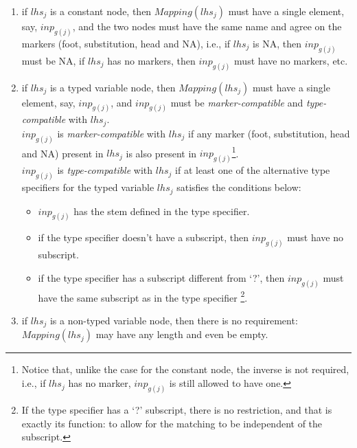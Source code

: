 \begin{enumerate}

\item if $lhs_j$ is a constant node, then $Mapping(lhs_j)$ must have a 
        single element, say, $inp_{g(j)}$, and the two nodes must have the same
        name and agree on the markers (foot, substitution, head and NA), i.e.,
        if $lhs_j$ is NA, then $inp_{g(j)}$ must be NA, 
        if $lhs_j$ has no markers, then $inp_{g(j)}$ must have no markers, etc.

\item if $lhs_j$ is a typed variable node, then $Mapping(lhs_j)$ must have a 
        single element, say, $inp_{g(j)}$, and $inp_{g(j)}$ must be 
        {\it marker-compatible} and 
        {\it type-compatible} with $lhs_j$. \\
        $inp_{g(j)}$ is 
        {\it marker-compatible} with $lhs_j$ if any marker
         (foot, substitution, head and NA) present in $lhs_j$ is also
        present in $inp_{g(j)}$\footnote{Notice that, unlike the case for the
        constant node, the inverse is not required, 
        i.e., if $lhs_j$ has no marker, $inp_{g(j)}$ is still 
        allowed to have one.}.\\
        $inp_{g(j)}$ is {\it type-compatible} with $lhs_j$ 
        if at least one of the alternative 
        type specifiers for the typed variable $lhs_j$ satisfies 
        the conditions below:

\begin{itemize}
\item   $inp_{g(j)}$ has the stem defined in the type specifier.
\item   if the type specifier doesn't have a subscript, then 
        $inp_{g(j)}$ must have no subscript.
\item   if the type specifier has a subscript different from `?', then 
        $inp_{g(j)}$ must have the same subscript as in the type specifier
        \footnote{If the type specifier has a `?' subscript, there is no
        restriction, and that is exactly its function: to allow for the 
        matching to be independent of the subscript.}.
\end{itemize}

\item if $lhs_j$ is a non-typed variable node, then there is no
        requirement: $Mapping(lhs_j)$ may have any length and even be 
        empty.
\end{enumerate}
        
